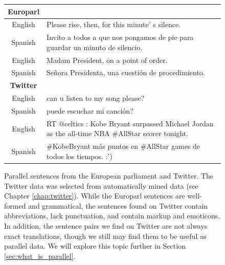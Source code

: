 \begin{figure}[ht]
\begin{tabular}{|c|l|}
\hline
{\textbf Europarl} &\\
\hline
English & Please rise, then, for this minute' s silence. \\
Spanish & \tiny Invito a todos a que nos pongamos de pie para guardar un minuto de
silencio. \\
\hline
English & Madam President, on a point of order. \\
Spanish & Señora Presidenta, una cuestión de procedimiento. \\
\hline
\hline
\textbf{Twitter} &\\
\hline
English & can u listen to my song please? \\
Spanish & puede escuchar mi canci\'{o}n? \\
\hline
English & \tiny RT @celtics : Kobe Bryant surpassed Michael Jordan as the all-time NBA
\#AllStar scorer tonight.\\
Spanish & \tiny \#KobeBryant m\'{a}s puntos en \#AllStar games de todos los tiempos. :')\\
\hline
\end{tabular}
\caption{ Parallel sentences from the European parliament and Twitter. The
Twitter data was selected from automatically mined data (see Chapter
\ref{chap:twitter}). While the Europarl sentences are well-formed and
grammatical, the sentences found on Twitter contain abbreviations, lack
punctuation, and contain markup and emoticons. In addition, the sentence pairs
we find on Twitter are not always exact translations, though we still may find
them to be useful as parallel data. We will explore this topic further in
Section \ref{sec:what_is_parallel}.}
\label{fig:europarl_twitter}
\end{figure}


